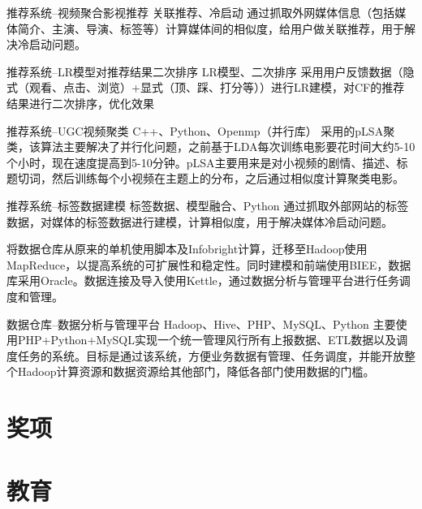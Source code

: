 \documentclass[11pt,a4paper]{moderncv}
\begin{document}
{推荐系统--视频聚合影视推荐}
{关联推荐、冷启动}
{}{}
{通过抓取外网媒体信息（包括媒体简介、主演、导演、标签等）计算媒体间的相似度，给用户做关联推荐，用于解决冷启动问题。}

\vspace*{0.2\baselineskip}
{推荐系统--LR模型对推荐结果二次排序}
{LR模型、二次排序}
{}{}
{采用用户反馈数据（隐式（观看、点击、浏览）+显式（顶、踩、打分等））进行LR建模，对CF的推荐结果进行二次排序，优化效果}

\vspace*{0.2\baselineskip}
{推荐系统--UGC视频聚类}
{C++、Python、Openmp（并行库）}
{}{}
{采用的pLSA聚类，该算法主要解决了并行化问题，之前基于LDA每次训练电影要花时间大约5-10个小时，现在速度提高到5-10分钟。pLSA主要用来是对小视频的剧情、描述、标题切词，然后训练每个小视频在主题上的分布，之后通过相似度计算聚类电影。}

\vspace*{0.2\baselineskip}
{推荐系统--标签数据建模}
{标签数据、模型融合、Python}
{}{}
{通过抓取外部网站的标签数据，对媒体的标签数据进行建模，计算相似度，用于解决媒体冷启动问题。}

\vspace*{0.2\baselineskip}
{将数据仓库从原来的单机使用脚本及Infobright计算，迁移至Hadoop使用MapReduce，以提高系统的可扩展性和稳定性。同时建模和前端使用BIEE，数据库采用Oracle。数据连接及导入使用Kettle，通过数据分析与管理平台进行任务调度和管理。}

\vspace*{0.2\baselineskip}
{数据仓库--数据分析与管理平台}
{Hadoop、Hive、PHP、MySQL、Python}
{}{}
{主要使用PHP+Python+MySQL实现一个统一管理风行所有上报数据、ETL数据以及调度任务的系统。目标是通过该系统，方便业务数据有管理、任务调度，并能开放整个Hadoop计算资源和数据资源给其他部门，降低各部门使用数据的门槛。}


\section{奖项}

\section{教育}
\end{document}
